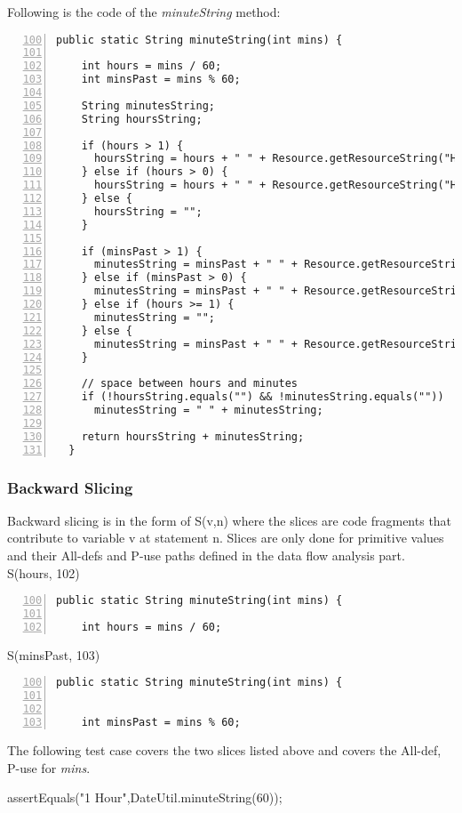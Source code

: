 \documentclass[fontsize=12pt,paper=letter,twoside]{scrartcl}
\begin{document}
\noindent Following is the code of the \emph{minuteString} method:
\begin{lstlisting}[numbers=left,firstnumber=100]
  public static String minuteString(int mins) {
    
    int hours = mins / 60;
    int minsPast = mins % 60;
    
    String minutesString;
    String hoursString;
    
    if (hours > 1) {
      hoursString = hours + " " + Resource.getResourceString("Hours");
    } else if (hours > 0) {
      hoursString = hours + " " + Resource.getResourceString("Hour");
    } else {
      hoursString = "";
    }

    if (minsPast > 1) {
      minutesString = minsPast + " " + Resource.getResourceString("Minutes");
    } else if (minsPast > 0) {
      minutesString = minsPast + " " + Resource.getResourceString("Minute");
    } else if (hours >= 1) {
      minutesString = "";
    } else {
      minutesString = minsPast + " " + Resource.getResourceString("Minutes");
    }

    // space between hours and minutes
    if (!hoursString.equals("") && !minutesString.equals(""))
      minutesString = " " + minutesString;

    return hoursString + minutesString;
  }
\end{lstlisting}

\subsubsection{Backward Slicing}
Backward slicing is in the form of S(v,n) where the slices are code fragments that contribute to variable v at statement n. Slices are only done for primitive values and their All-defs and P-use paths defined in the data flow analysis part.\\

S(hours, 102)
\begin{lstlisting}[numbers=left,firstnumber=100]
  public static String minuteString(int mins) {
    
    int hours = mins / 60;
\end{lstlisting}  


S(minsPast, 103)
\begin{lstlisting}[numbers=left,firstnumber=100]
  public static String minuteString(int mins) {
    
    
    int minsPast = mins % 60;
\end{lstlisting} 
The following test case covers the two slices listed above and covers the All-def, P-use for \emph{mins}.
\begin{code}
  assertEquals("1 Hour",DateUtil.minuteString(60));
\end{code}
\end{document}

